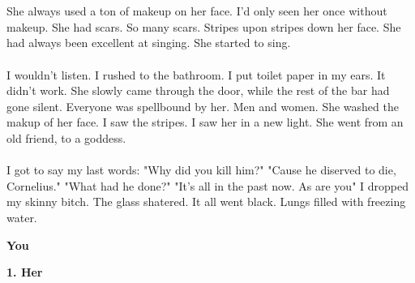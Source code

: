 \documentclass[]{article}
\begin{document}
\\ \\
She always used a ton of makeup on her face. I'd only seen her once without makeup. She had scars. So many scars. Stripes upon stripes down her face. She had always been excellent at singing. She started to sing.
\\ \\
I wouldn't listen. I rushed to the bathroom. I put toilet paper in my ears. It didn't work. She slowly came through the door, while the rest of the bar had gone silent. Everyone was spellbound by her. Men and women. She washed the makup of her face. I saw the stripes. I saw her in a new light. She went from an old friend, to a goddess. 
\\ \\
I got to say my last words: "Why did you kill him?" "Cause he diserved to die, Cornelius." "What had he done?" "It's all in the past now. As are you" I dropped my skinny bitch. The glass shatered. It all went black. Lungs filled with freezing water.

\begin{center}
	\Large\textbf{You}
\end{center}

\begin{center}
	\large\textbf{1. Her}
\end{center}
\end{document}
